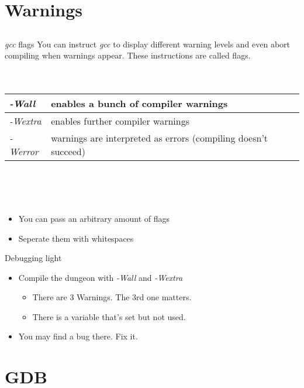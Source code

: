 \section{Warnings}
\subsection{}
\begin{frame}{\textit{gcc} flags}
	You can instruct \textit{gcc} to display different warning levels and even abort compiling when warnings appear.
	These instructions are called flags.\\\ \\\ \\
	\begin{tabular}{|l|l|}\hline
		\textit{-Wall} & enables a bunch of compiler warnings\\\hline
		\textit{-Wextra} & enables further compiler warnings\\\hline
		\textit{-Werror} & warnings are interpreted as errors (compiling doesn't succeed)\\\hline
	\end{tabular}
	\ \\\ \\\ \\
	\begin{itemize}
		\item You can pass an arbitrary amount of flags
		\item Seperate them with whitespaces
	\end{itemize}
\end{frame}
\begin{frame}{Debugging light}
	\begin{itemize}
		\item Compile the dungeon with \textit{-Wall} and \textit{-Wextra}
		\begin{itemize}		
			\item There are 3 Warnings. The 3rd one matters.
			\item There is a variable that's set but not used.
		\end{itemize}
		\item You may find a bug there. Fix it.
	\end{itemize}
\end{frame}
\section{GDB}
